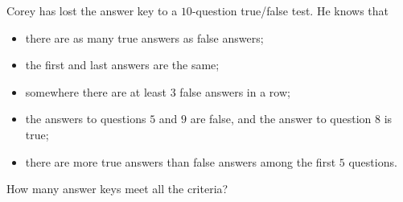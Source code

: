 Corey has lost the answer key to a $10$-question true/false test. He knows that
\begin{itemize}
\item there are as many true answers as false answers;
\item the first and last answers are the same;
\item somewhere there are at least $3$ false answers in a row;
\item the answers to questions $5$ and $9$ are false, and the answer to question $8$ is true;
\item there are more true answers than false answers among the first $5$ questions.
\end{itemize}
How many answer keys meet all the criteria?
